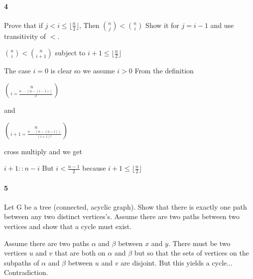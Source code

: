 \documentclass[10 pt]{article}
\begin{document}
\paragraph{4}Prove that if $j<i\leq \lfloor \frac{n}{2} \rfloor$, Then ${n \choose j} < {n \choose i}$
Show it for $j=i-1$ and use transitivity of $<$.

${n \choose i} < {n \choose i+1}$ subject to $i+1 \leq \lfloor \frac{n}{2} \rfloor$

The case $i=0$ is clear so we assume $i>0$ From the definition

$n \choose i = \frac{ n \cdot \cdot \cdot (n-(i-1))}{i!}$

and

$n \choose i+1 = \frac{ n \cdot \cdot \cdot (n-(n-i))}{(i+1)!}$

cross multiply and we get

$i +1 :: n-i$ But $i < \frac{n-1}{2}$ because $ i+1 \leq \lfloor \frac{n}{2} \rfloor$
\paragraph{5} Let G be a tree (connected, acyclic graph). Show that there is exactly one path between any two distinct vertices's. Assume there are two paths between two vertices and show that a cycle must exist.

Assume there are two paths $\alpha$ and $\beta$ between $x$ and $y$. There must be two vertices $u$ and $v$ that are both on $\alpha$ and $\beta$ but so that the sets of vertices on the subpaths of $\alpha$ and $\beta$ between $u$ and $v$ are disjoint. But this yields a cycle... Contradiction.
\end{document}
